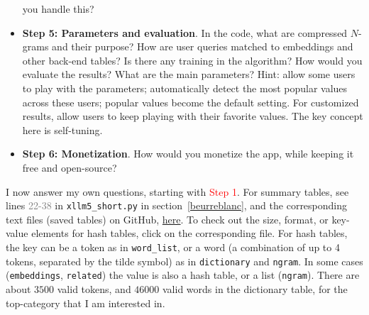 \documentclass[oneside,10pt]{book}
\begin{document}
\begin{itemize}
 you handle this? 
\vspace{1ex}
\item[] {\bf Step 5: Parameters and evaluation}.  In the code, what are compressed $N$-grams and their purpose? How are user queries matched to embeddings and other back-end tables? Is there any training in the algorithm?
How would you evaluate the results? What are the main parameters? Hint: allow some users to play with the parameters; automatically detect the most popular values across these users; 
 popular values become the default setting. For customized results, allow users to keep playing with their favorite values. The key concept here is \textcolor{index}{self-tuning}.
\vspace{1ex}
\item[] {\bf Step 6: Monetization}.  How would you monetize the app, while keeping it free and open-source?
\end{itemize}
\vspace{1ex}

 

\noindent I now answer my own questions, starting with \textcolor{red}{Step 1}. For summary tables,  see lines \textcolor{gray}{22-38}
in \texttt{xllm5\_short.py} in section~\ref{beurreblanc},
 and the corresponding text files (saved tables)
on GitHub, 
\href{https://github.com/VincentGranville/Large-Language-Models/tree/main/xllm5}{here}.
To check out the size, format, or key-value elements for hash tables, 
click on the corresponding file. For hash tables, the key can be a token as in \texttt{word\_list}, or a word (a combination of up to 4 tokens, separated 
 by the tilde symbol) as in \texttt{dictionary} and \texttt{ngram}. In some cases (\texttt{embeddings}, \texttt{related}) the value is also a hash table, or a list (\texttt{ngram}).  
There are about $\num{3500}$ valid tokens, and $\num{46000}$ valid words in the dictionary table, for the top-category that I am interested in. 
\end{document}
